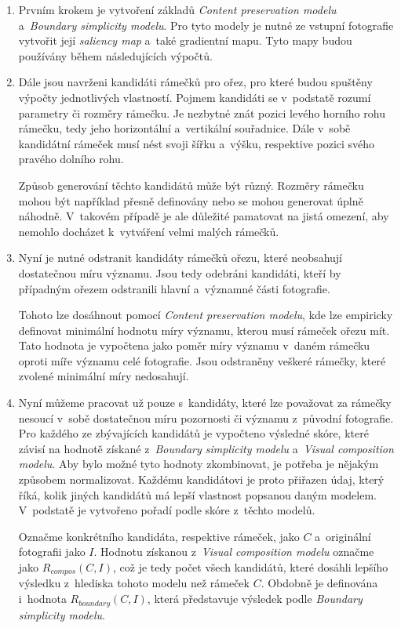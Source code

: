\begin{enumerate}
\item Prvním krokem je vytvoření základů \emph{Content preservation modelu} a~\emph{Boundary simplicity modelu}. Pro tyto modely je nutné ze vstupní fotografie vytvořit její \emph{saliency map} a~také gradientní mapu. Tyto mapy budou používány během následujících výpočtů.

\item Dále jsou navrženi kandidáti rámečků pro ořez, pro které budou spuštěny výpočty jednotlivých vlastností. Pojmem kandidáti se v~podstatě rozumí parametry či rozměry rámečku. Je nezbytné znát pozici levého horního rohu rámečku, tedy jeho horizontální a~vertikální souřadnice. Dále v~sobě kandidátní rámeček musí nést svoji šířku a~výšku, respektive pozici svého pravého dolního rohu. 

Způsob generování těchto kandidátů může být různý. Rozměry rámečku mohou být například přesně definovány nebo se mohou generovat úplně náhodně. V~takovém případě je ale důležité pamatovat na jistá omezení, aby nemohlo docházet k~vytváření velmi malých rámečků.

\item Nyní je nutné odstranit kandidáty rámečků ořezu, které neobsahují dostatečnou míru významu. Jsou tedy odebráni kandidáti, kteří by případným ořezem odstranili hlavní a~významné části fotografie.

Tohoto lze dosáhnout pomocí \emph{Content preservation modelu}, kde lze empiricky definovat minimální hodnotu míry významu, kterou musí rámeček ořezu mít. Tato hodnota je vypočtena jako poměr míry významu v~daném rámečku oproti míře významu celé fotografie. Jsou odstraněny veškeré rámečky, které zvolené minimální míry nedosahují.

\item Nyní můžeme pracovat už pouze s~kandidáty, které lze považovat za rámečky nesoucí v~sobě dostatečnou míru pozornosti či významu z~původní fotografie. Pro každého ze zbývajících kandidátů je vypočteno výsledné skóre, které závisí na hodnotě získané z~\emph{Boundary simplicity modelu} a~\emph{Visual composition modelu}. Aby bylo možné tyto hodnoty zkombinovat, je potřeba je nějakým způsobem normalizovat. Každému kandidátovi je proto přiřazen údaj, který říká, kolik jiných kandidátů má lepší vlastnost popsanou daným modelem. V~podstatě je vytvořeno pořadí podle skóre z~těchto modelů. 

Označme konkrétního kandidáta, respektive rámeček, jako $C$ a~originální fotografii jako $I$. Hodnotu získanou z~\emph{Visual composition modelu} označme jako $R_{compos} (C, I)$, což je tedy počet všech kandidátů, které dosáhli lepšího výsledku z~hlediska tohoto modelu než rámeček $C$. Obdobně je definována i~hodnota $R_{boundary} (C, I)$, která představuje výsledek podle \emph{Boundary simplicity modelu}. 


\end{enumerate}
